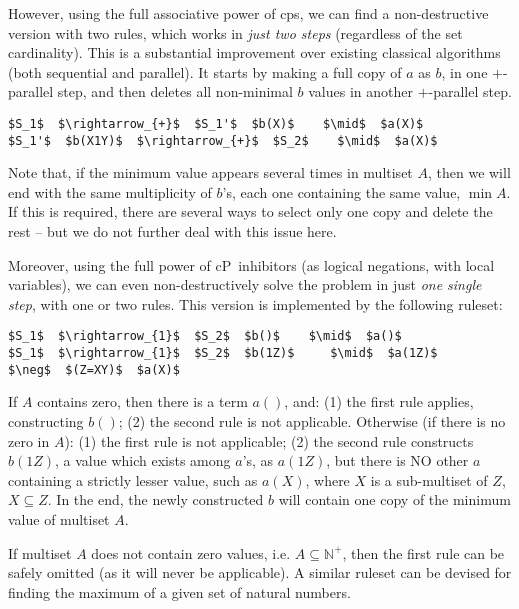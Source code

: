However, using the full associative power of \gls{cps}, we can find a non-destructive version with two rules, 
which works in \emph{just two steps} (regardless of the set cardinality). 
This is a substantial improvement over existing classical algorithms (both sequential and parallel). 
It starts by making a full copy of $a$ as $b$, in one $+$-parallel step, 
and then deletes all non-minimal $b$ values in another $+$-parallel step. 

\lstset{xleftmargin=.5in, xrightmargin=.5in} 
\begin{lstlisting}
$S_1$  $\rightarrow_{+}$  $S_1'$  $b(X)$    $\mid$  $a(X)$  
$S_1'$  $b(X1Y)$  $\rightarrow_{+}$  $S_2$    $\mid$  $a(X)$  
\end{lstlisting}

Note that, if the minimum value appears several times in multiset $A$, 
then we will end with the same multiplicity of $b$'s, each one containing the same value, $\min A$.
If this is required, there are several ways to select only one copy and delete the rest --
but we do not further deal with this issue here.

Moreover, using the full power of cP~inhibitors (as logical negations, with local variables), 
we can even non-destructively solve the problem in just \emph{one single step},
with one or two rules.
This version is implemented by the following ruleset:

\lstset{xleftmargin=.5in, xrightmargin=.5in} 
\begin{lstlisting}
$S_1$  $\rightarrow_{1}$  $S_2$  $b()$    $\mid$  $a()$
$S_1$  $\rightarrow_{1}$  $S_2$  $b(1Z)$     $\mid$  $a(1Z)$     $\neg$  $(Z=XY)$  $a(X)$
\end{lstlisting}

If $A$ contains zero, then there is a term $a()$, and: (1) the first rule applies, constructing $b()$; (2) the second rule is not applicable.
Otherwise (if there is no zero in $A$): (1) the first rule is not applicable; (2) the second rule constructs $b(1Z)$, 
a value which exists among $a$'s, as $a(1Z)$, but there is NO other $a$ containing a strictly lesser value, such as $a(X)$,
where $X$ is a sub-multiset of $Z$, $X \subseteq Z$.
In the end, the newly constructed $b$ will contain one copy of the minimum value of multiset $A$.

If multiset $A$ does not contain zero values, i.e. $A \subseteq \mathbb{N}^+$, then the first rule can be safely omitted (as it will never be applicable). 
A similar ruleset can be devised for finding the maximum of a given set of natural numbers.